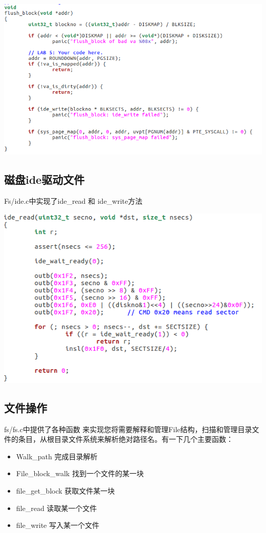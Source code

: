 \includegraphics[width=6in]{figures/file/fig6.png}

\subsection{磁盘ide驱动文件}

Fs/ide.c中实现了ide\_read 和 ide\_write方法

\includegraphics[width=6in]{figures/file/fig5.png}

\subsection{文件操作}

fs/fs.c中提供了各种函数 来实现您将需要解释和管理File结构，扫描和管理目录文件的条目，从根目录文件系统来解析绝对路径名。有一下几个主要函数：

\begin{itemize}
\item Walk\_path 完成目录解析
\item File\_block\_walk 找到一个文件的某一块
\item file\_get\_block 获取文件某一块
\item file\_read 读取某一个文件
\item file\_write 写入某一个文件
\end{itemize}

